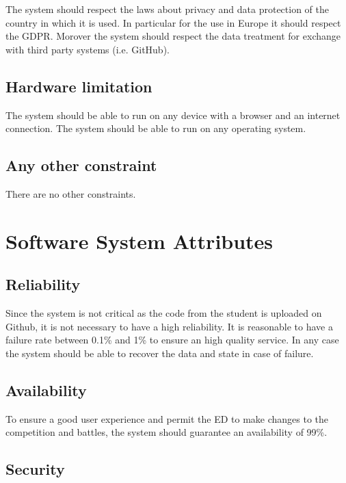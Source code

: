 The system should respect the laws about privacy and data protection of the country in which it is used. In particular for the use in Europe it should respect the GDPR. Morover the system should respect the data treatment for exchange with third party systems (i.e. GitHub).

\subsection{Hardware limitation}
\label{ss:Hardware_limitation}%

The system should be able to run on any device with a browser and an internet connection. The system should be able to run on any operating system.

\subsection{Any other constraint}
\label{ss:Any_other_constraint}%

There are no other constraints.

\section{Software System Attributes}
\label{s:Software_system_attributes}%

\subsection{Reliability}
\label{ss:Reliability}%

Since the system is not critical as the code from the student is uploaded on Github, it is not necessary to have a high reliability. It is reasonable to have a failure rate between 0.1\% and 1\% to ensure an high quality service. In any case the system should be able to recover the data and state in case of failure.

\subsection{Availability}
\label{ss:Availability}%

To ensure a good user experience and permit the ED to make changes to the competition and battles, the system should guarantee an availability of 99\%.


\subsection{Security}
\label{ss:Security}%

